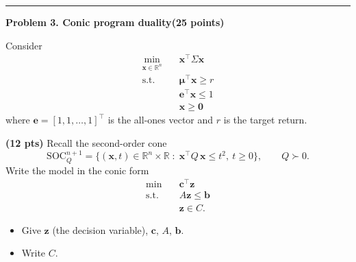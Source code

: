 \documentclass[10pt]{article}
\newcommand{\problem}[2]{%
  \par\bigskip
  {\color{ruleink}\rule{\textwidth}{1pt}}\par\nobreak\vspace{3pt}
  {\large\bfseries #2}\hfill{\normalsize\bfseries(#1 points)}\par\nobreak\vspace{4pt}}
\begin{document}
\problem{25}{Problem 3. Conic program duality}

Consider
\[
\begin{aligned}
  \min_{\bm{x} \in \mathbb{R}^n} \quad & \bm{x}^{\top}\Sigma \bm{x} \\
  \text{s.t.} \quad & \bm{\mu}^{\top}\bm{x} \ge r \\
                    & \bm{e}^{\top}\bm{x} \le 1 \\
                    & \bm{x} \ge \bm{0}
\end{aligned}
\]
where $\bm{e} = [1, 1, \dots, 1]^{\top}$ is the all-ones vector and $r$ is the target return.

\begin{parts}
\item \textbf{(12 pts)} Recall the second-order cone
  \[
    \mathrm{SOC}_Q^{n+1} = \big\{ (\bm{x}, t) \in \mathbb{R}^n \times \mathbb{R} \;:\; \bm{x}^{\top}Q\,\bm{x} \le t^2,\ t \ge 0 \big\},
    \qquad Q \succ 0 .
  \]
  Write the model in the conic form
  \[
  \begin{aligned}
    \min \quad & \bm{c}^{\top}\bm{z} \\
    \text{s.t.} \quad & A\bm{z} \le \bm{b} \\
                      & \bm{z} \in C .
  \end{aligned}
  \]
  \begin{itemize}[leftmargin=2.2em, itemsep=2pt, topsep=3pt]
    \item Give $\bm{z}$ (the decision variable), $\bm{c}$, $A$, $\bm{b}$.
    \item Write $C$.
  \end{itemize}


\end{parts}
\end{document}
